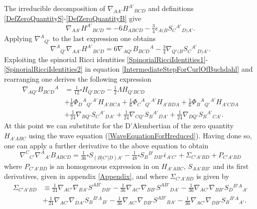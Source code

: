 \documentclass[10pt,a4paper]{article}
\theoremstyle{plain}
\begin{document}
The irreducible decomposition of $\nabla_{AA'}H^{A'}{}_{BCD}$ and
definitions \eqref{DefZeroQuantityS}-\eqref{DefZeroQuantityB} give
\begin{equation}
\nabla_{AA'}H^{A'}{}_{BCD} = -6 B_{ABCD} - \tfrac{3}{4} \epsilon_{A(B}
S_{C}{}^{A'}{}_{D)A'}.
\end{equation}
Applying $\nabla^{A}{}_{Q'}$ to the last expression one obtains
\begin{equation}\label{IntermediateStepForCurlOfBuchdahl}
\nabla^{A}{}_{Q'}\nabla_{AA'}H^{A'}{}_{BCD} = 6
\nabla_{AQ'}B_{BCD}{}^{A} - \tfrac{3}{4}
\nabla_{Q'(B}S_{C}{}^{A'}{}_{D)A'}.
\end{equation}
Exploiting the spinorial Ricci identities
\eqref{SpinorialRicciIdentities1}-\eqref{SpinorialRicciIdentities2} in equation
\eqref{IntermediateStepForCurlOfBuchdahl} and rearranging one derives
the following expression
\begin{align*}
\nabla_{AQ'}B_{BCD}{}^{A}&=\tfrac{1}{12}\square H_{Q'BCD} -
\tfrac{1}{2} \Lambda H_{Q'BCD} \\ &+\tfrac{1}{6}
\Phi_{D}{}^{A}{}_{Q'}{}^{A'} H_{A'BCA} + \tfrac{1}{6}
\Phi_{C}{}^{A}{}_{Q'}{}^{A'} H_{A'BDA} + \tfrac{1}{6}
\Phi_{B}{}^{A}{}_{Q'}{}^{A'} H_{A'CDA} \\ &+ \tfrac{1}{24}
\nabla_{BQ'}S_{C}{}^{A'}{}_{DA'} + \tfrac{1}{24}
\nabla_{CQ'}S_{B}{}^{A'}{}_{DA'} + \tfrac{1}{24}
\nabla_{DQ'}S_{B}{}^{A'}{}_{CA'}.
\end{align*}
At this point we can substitute for the D'Alembertian of the zero
quantity $H_{A'ABC}$ using the wave equation
(\ref{WaveEquationForHreduced}). Having done so, one can apply a
further derivative to the above equation to obtain
\begin{equation}
\nabla^{C}{}_{C'}\nabla^{A}{}_{A'}B_{ABCD}=\tfrac{1}{36}\square
S_{(B|C'|D)A'} -\tfrac{1}{48}\square
S_{B}{}^{B'}{}_{DB'}\bar{\epsilon}_{A'C'} + \Sigma_{C'A'BD} +
P_{C'A'BD}
\end{equation}
where $ P_{C'A'BD}$ is an homogeneous expression in on $H_{A'ABC}$,
$S_{AA'BB'}$ and its first derivatives, given in appendix
\ref{Appendix}, and where $\Sigma_{C'A'BD}$ is given by
\begin{align*}
\Sigma_{C'A'BD} &\equiv \tfrac{1}{24}
\nabla_{AC'}\nabla_{BA'}S^{AB'}{}_{DB'} - \tfrac{1}{36}
\nabla_{AC'}\nabla_{BB'}S^{AB'}{}_{DA'} - \tfrac{1}{36}
\nabla_{AC'}\nabla_{BB'}S_{D}{}^{B'A}{}_{A'} \\ &+ \tfrac{1}{24}
\nabla_{AC'}\nabla_{DA'}S_{B}{}^{B'A}{}_{B'} - \tfrac{1}{36}
\nabla_{AC'}\nabla_{DB'}S^{AB'}{}_{BA'} - \tfrac{1}{36}
\nabla_{AC'}\nabla_{DB'}S_{B}{}^{B'A}{}_{A'}.
\end{align*}
\end{document}
